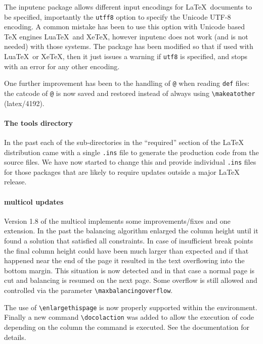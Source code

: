 \documentclass{ltnews}
\begin{document}
The \textsf{inputenc} package allows different input encodings for
\LaTeX\ documents to be specified, importantly the \texttt{utff8}
option to specify the Unicode UTF-8 encoding. A common mistake has been
to use this option with Unicode based TeX engines Lua\TeX\ and Xe\TeX,
however \textsf{inputenc} does not work (and is not needed) with those
systems. The package has been modified so that if used with  Lua\TeX\ 
or  Xe\TeX, then it just issues a warning if \texttt{utf8} is
specified, and stops with an error for any other encoding.

One further improvement has been to the handling of \texttt{@} when
  reading \texttt{def} files: the  catcode of \texttt{@} is now saved
  and restored instead of always using \verb=\makeatother=  (latex/4192).



\paragraph{The tools directory}

In the past each of the sub-directories in the ``required'' section of
the \LaTeX{} distribution came with a single \texttt{.ins} file to
generate the production code from the source files. We have now
started to change this and provide individual \texttt{.ins} files for
those packages that are likely to require updates outside a major
\LaTeX{} release.

\paragraph{\textsf{multicol} updates}

Version 1.8 of the \textsf{multicol} implements some
improvements/fixes and one extension. In the past the balancing
algorithm enlarged the column height until it found a solution that
satisfied all constraints. In case of insufficient break points the
final column height could have been much larger than expected and if
that happened near the end of the page it resulted in the text
overflowing into the bottom margin. This situation is now detected and
in that case a normal page is cut and balancing is resumed on the next
page. Some overflow is still allowed and controlled via the parameter
\verb=\maxbalancingoverflow=.

The use of \verb=\enlargethispage= is now properly supported
within the environment. Finally a new command \verb=\docolaction= was
added to allow the execution of code depending on the column the
command is executed. See the documentation for details.
\end{document}

